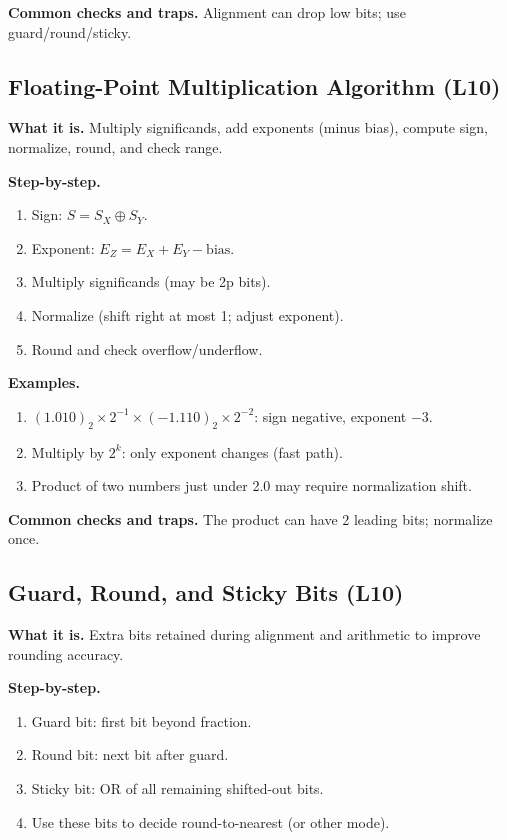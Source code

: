 \documentclass[11pt]{article}
\begin{document}
\textbf{Common checks and traps.} Alignment can drop low bits; use guard/round/sticky.

\subsection{Floating-Point Multiplication Algorithm (L10)}
\textbf{What it is.} Multiply significands, add exponents (minus bias), compute sign, normalize, round, and check range.

\textbf{Step-by-step.}
\begin{enumerate}[leftmargin=*]
  \item Sign: $S = S_X \oplus S_Y$.
  \item Exponent: $E_Z = E_X + E_Y - \text{bias}$.
  \item Multiply significands (may be 2p bits).
  \item Normalize (shift right at most 1; adjust exponent).
  \item Round and check overflow/underflow.
\end{enumerate}

\textbf{Examples.}
\begin{enumerate}[leftmargin=*]
  \item $(1.010)_2 \times 2^{-1} \times (-1.110)_2 \times 2^{-2}$: sign negative, exponent $-3$.
  \item Multiply by $2^k$: only exponent changes (fast path).
  \item Product of two numbers just under 2.0 may require normalization shift.
\end{enumerate}

\textbf{Common checks and traps.} The product can have 2 leading bits; normalize once.

\subsection{Guard, Round, and Sticky Bits (L10)}
\textbf{What it is.} Extra bits retained during alignment and arithmetic to improve rounding accuracy.

\textbf{Step-by-step.}
\begin{enumerate}[leftmargin=*]
  \item Guard bit: first bit beyond fraction.
  \item Round bit: next bit after guard.
  \item Sticky bit: OR of all remaining shifted-out bits.
  \item Use these bits to decide round-to-nearest (or other mode).
\end{enumerate}
\end{document}
